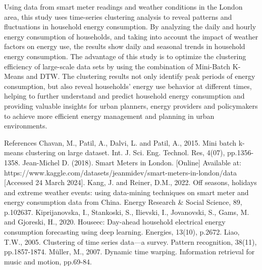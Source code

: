 \documentclass[11pt]{article}
\begin{document}
Using data from smart meter readings and weather conditions in the
London area, this study uses time-series clustering analysis to reveal
patterns and fluctuations in household energy consumption. By analyzing
the daily and hourly energy consumption of households, and taking into
account the impact of weather factors on energy use, the results show
daily and seasonal trends in household energy consumption. The advantage
of this study is to optimize the clustering efficiency of large-scale
data sets by using the combination of Mini-Batch K-Means and DTW. The
clustering results not only identify peak periods of energy consumption,
but also reveal households' energy use behavior at different times,
helping to further understand and predict household energy consumption
and providing valuable insights for urban planners, energy providers and
policymakers to achieve more efficient energy management and planning in
urban environments.

    References Chavan, M., Patil, A., Dalvi, L. and Patil, A., 2015. Mini
batch k-means clustering on large dataset. Int. J. Sci. Eng. Technol.
Res, 4(07), pp.1356-1358. Jean-Michel D. (2018). Smart Meters in London.
{[}Online{]} Available at:
https://www.kaggle.com/datasets/jeanmidev/smart-meters-in-london/data
{[}Accessed 24 March 2024{]}. Kang, J. and Reiner, D.M., 2022. Off
seasons, holidays and extreme weather events: using data-mining
techniques on smart meter and energy consumption data from China. Energy
Research \& Social Science, 89, p.102637. Kiprijanovska, I., Stankoski,
S., Ilievski, I., Jovanovski, S., Gams, M. and Gjoreski, H., 2020.
Houseec: Day-ahead household electrical energy consumption forecasting
using deep learning. Energies, 13(10), p.2672. Liao, T.W., 2005.
Clustering of time series data---a survey. Pattern recognition, 38(11),
pp.1857-1874. Müller, M., 2007. Dynamic time warping. Information
retrieval for music and motion, pp.69-84.


    
    
    
\end{document}
